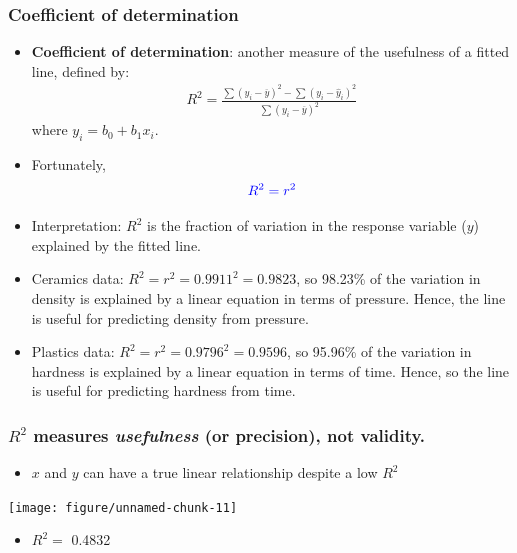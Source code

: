 \documentclass[handout]{beamer}\usepackage{graphicx, color}
\newenvironment{knitrout}{}{} %
\providecommand{\ov}[1]{\overline{#1}}
\providecommand{\wh}[1]{\widehat{#1}}
\numberwithin{equation}{section}
\begin{document}
\begin{frame}
\frametitle{Coefficient of determination} \scriptsize
\begin{itemize}
\pause \item {\bf Coefficient of determination}: another measure of the usefulness of a fitted line, defined by:
\pause \begin{align*}
R^2 = \frac{\sum(y_i - \ov{y})^2 - \sum(y_i - \wh{y}_i)^2}{\sum(y_i - \ov{y})^2}
\end{align*}
\pause where $y_i = b_0 + b_1 x_i$. 
\pause \item Fortunately,
\begin{align*} \color{blue}
R^2 = r^2
\end{align*}
\pause \item Interpretation: $R^2$ is the fraction of variation in the response variable ($y$) explained by the fitted line.
\pause \item Ceramics data: $R^2 = r^2 = 0.9911^2 = 0.9823$, so  98.23\% of the variation in density is explained by a linear equation in terms of pressure. Hence, the line is useful for predicting density from pressure.
\pause \item Plastics data: $R^2 = r^2 = 0.9796^2 = 0.9596$, so  95.96\% of the variation in hardness is explained by a linear equation in terms of time. Hence, so the line is useful for predicting hardness from time.

\end{itemize}
\end{frame}


\begin{frame}[fragile]
\frametitle{\small $R^2$ measures \emph{usefulness} (or precision), not validity.}
\begin{center}
\begin{itemize}
\item $x$ and $y$ can have a true linear relationship despite a low $R^2$
\end{itemize}
\begin{knitrout}
\color{fgcolor}
\texttt{[image: figure/unnamed-chunk-11]} 

\end{knitrout}

\end{center}
\begin{itemize}
\item $R^2 = $ 0.4832
\end{itemize}
\end{frame}
\end{document}
